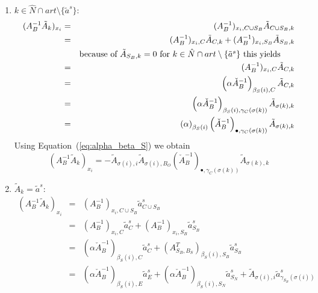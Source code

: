 \documentclass[a4paper]{article}
\begin{document}
\begin{enumerate}
\item $k \in \hat{N} \cap art \setminus \{\tilde{a}^{s}\}$:
\begin{eqnarray}
  (A_{B}^{-1}\tilde{A}_{k})_{x_{i}} &=& 
  (A_{B}^{-1})_{x_{i}, C \cup S_{B}}\tilde{A}_{C \cup S_{B}, k}
  \nonumber \\
  &=&
  (A_{B}^{-1})_{x_{i}, C}\tilde{A}_{C, k} +
  (A_{B}^{-1})_{x_{i}, S_{B}}\tilde{A}_{S_{B}, k} 
  \nonumber \\
  &&\begin{minipage}{9cm}
  because of $\tilde{A}_{S_{B}, k}=0$ for
  $k \in \hat{N} \cap art \setminus \{ \tilde{a}^{s} \}$ this yields
  \end{minipage}
  \nonumber \\  
  &=&
  (A_{B}^{-1})_{x_{i}, C}\tilde{A}_{C, k}
  \nonumber \\ 
  &=&
  \left(\alpha\check{A}_{B}^{-1}\right)_{\beta_{S}(i),C}\tilde{A}_{C, k}
  \nonumber \\
  &=&
  \left(\alpha\check{A}_{B}^{-1}\right)_{\beta_{S}(i), \gamma_{C}(\sigma(k))}
  \tilde{A}_{\sigma(k), k}
  \nonumber \\
  &=&
  \left(\alpha\right)_{\beta_{S}(i)}
  \left(\check{A}_{B}^{-1}\right)_{\bullet, \gamma_{C}(\sigma(k))}
  \tilde{A}_{\sigma(k), k}
  \nonumber
\end{eqnarray}
Using Equation~(\ref{eq:alpha_beta_S}) we obtain
\begin{equation}
(A_{B}^{-1}\tilde{A}_{k})_{x_{i}} =
  -\tilde{A}_{\sigma(i), i}\tilde{A}_{\sigma(i), B_{O}}
  \left(\check{A}_{B}^{-1}\right)_{\bullet, \gamma_{C}(\sigma(k))}
  \tilde{A}_{\sigma(k), k}
\end{equation}
\item $\tilde{A}_{k}=\tilde{a}^{s}$:
\begin{eqnarray}
  (A_{B}^{-1}\tilde{A}_{k})_{x_{i}} &=& 
  (A_{B}^{-1})_{x_{i}, C \cup S_{B}}\tilde{a}_{C \cup S_{B}}^{s}
  \nonumber \\
  &=&
  (A_{B}^{-1})_{x_{i}, C}\tilde{a}_{C}^{s} +
  (A_{B}^{-1})_{x_{i}, S_{B}}\tilde{a}_{S_{B}}^{s}
  \nonumber \\
  &=&
  (\alpha\check{A}_{B}^{-1})_{\beta_{S}(i),C}\tilde{a}_{C}^{s}
  +(A_{S_{B}, B_{S}}^{T})_{\beta_{S}(i), S_{B}}\tilde{a}_{S_{B}}^{s}
  \nonumber \\ 
  &=&
  (\alpha\check{A}_{B}^{-1})_{\beta_{S}(i), E}\tilde{a}_{E}^{s}
  +(\alpha\check{A}_{B}^{-1})_{\beta_{S}(i), S_{N}}\tilde{a}_{S_{N}}^{s}
  + \tilde{A}_{\sigma(i), i}\tilde{a}_{\gamma_{S_{B}}(\sigma(i))}^{s}
  \nonumber \\

\end{eqnarray}
\end{enumerate}
\end{document}
